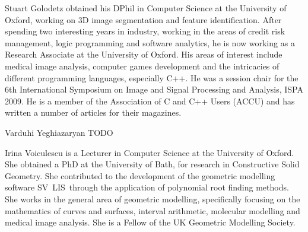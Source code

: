 \documentclass[10pt,twocolumn,twoside]{IEEEtran}
\newcommand{\svlis}{%
\mbox{\scriptsize S\hspace{-0.2mm}\footnotesize V\hspace{-0.2mm}%
\normalsize L\hspace{0.1mm}\footnotesize I\hspace{0.2mm}\scriptsize S\ }}
\begin{document}
\clearpage




\vspace{3cm}

\begin{IEEEbiography}{Stuart Golodetz}
obtained his DPhil in Computer Science at the University of Oxford, working on 3D image segmentation and feature identification. After spending two interesting years in industry, working in the areas of credit risk management, logic programming and software analytics, he is now working as a Research Associate at the University of Oxford. His areas of interest include medical image analysis, computer games development and the intricacies of different programming languages, especially C++. He was a session chair for the 6th International Symposium on Image and Signal Processing and Analysis, ISPA 2009. He is a member of the Association of C and C++ Users (ACCU) and has written a number of articles for their magazines.
\end{IEEEbiography}

\begin{IEEEbiography}[]{Varduhi Yeghiazaryan}
TODO
\end{IEEEbiography}

\begin{IEEEbiography}{Irina Voiculescu}
is a Lecturer in Computer Science at the University of Oxford. She obtained a PhD at the University of Bath, for research in Constructive Solid Geometry. She contributed to the development of the geometric modelling software \svlis through the application of polynomial root finding methods. She works in the general area of geometric modelling, specifically focusing on the mathematics of curves and surfaces, interval arithmetic, molecular modelling and medical image analysis. She is a Fellow of the UK Geometric Modelling Society.
\end{IEEEbiography}
\end{document}
